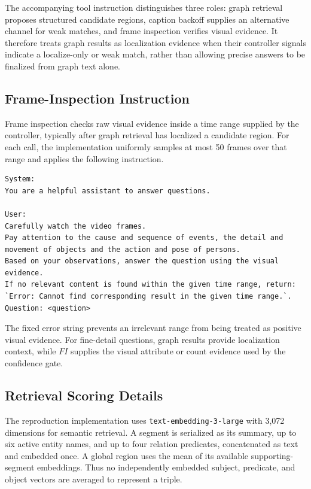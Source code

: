 The accompanying tool instruction distinguishes three roles: graph retrieval proposes structured candidate regions, caption backoff supplies an alternative channel for weak matches, and frame inspection verifies visual evidence.
It therefore treats graph results as localization evidence when their controller signals indicate a localize-only or weak match, rather than allowing precise answers to be finalized from graph text alone.

\subsection{Frame-Inspection Instruction}

Frame inspection checks raw visual evidence inside a time range supplied by the controller, typically after graph retrieval has localized a candidate region.
For each call, the implementation uniformly samples at most 50 frames over that range and applies the following instruction.

\begin{lstlisting}
System:
You are a helpful assistant to answer questions.

User:
Carefully watch the video frames.
Pay attention to the cause and sequence of events, the detail and movement of objects and the action and pose of persons.
Based on your observations, answer the question using the visual evidence.
If no relevant content is found within the given time range, return: `Error: Cannot find corresponding result in the given time range.`.
Question: <question>
\end{lstlisting}

The fixed error string prevents an irrelevant range from being treated as positive visual evidence.
For fine-detail questions, graph results provide localization context, while $FI$ supplies the visual attribute or count evidence used by the confidence gate.

\subsection{Retrieval Scoring Details}
\label{sec:retrieval-details}

The reproduction implementation uses \texttt{text-embedding-3-large} with 3,072 dimensions for semantic retrieval.
A segment is serialized as its summary, up to six active entity names, and up to four relation predicates, concatenated as text and embedded once.
A global region uses the mean of its available supporting-segment embeddings.
Thus no independently embedded subject, predicate, and object vectors are averaged to represent a triple.

